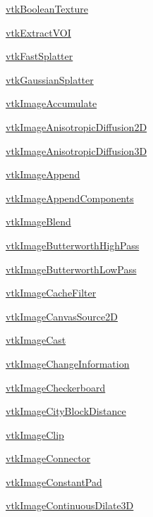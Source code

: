 
\begin{DoxyItemize}
\item \hyperlink{vtkimaging_vtkbooleantexture}{vtk\-Boolean\-Texture}  
\item \hyperlink{vtkimaging_vtkextractvoi}{vtk\-Extract\-V\-O\-I}  
\item \hyperlink{vtkimaging_vtkfastsplatter}{vtk\-Fast\-Splatter}  
\item \hyperlink{vtkimaging_vtkgaussiansplatter}{vtk\-Gaussian\-Splatter}  
\item \hyperlink{vtkimaging_vtkimageaccumulate}{vtk\-Image\-Accumulate}  
\item \hyperlink{vtkimaging_vtkimageanisotropicdiffusion2d}{vtk\-Image\-Anisotropic\-Diffusion2\-D}  
\item \hyperlink{vtkimaging_vtkimageanisotropicdiffusion3d}{vtk\-Image\-Anisotropic\-Diffusion3\-D}  
\item \hyperlink{vtkimaging_vtkimageappend}{vtk\-Image\-Append}  
\item \hyperlink{vtkimaging_vtkimageappendcomponents}{vtk\-Image\-Append\-Components}  
\item \hyperlink{vtkimaging_vtkimageblend}{vtk\-Image\-Blend}  
\item \hyperlink{vtkimaging_vtkimagebutterworthhighpass}{vtk\-Image\-Butterworth\-High\-Pass}  
\item \hyperlink{vtkimaging_vtkimagebutterworthlowpass}{vtk\-Image\-Butterworth\-Low\-Pass}  
\item \hyperlink{vtkimaging_vtkimagecachefilter}{vtk\-Image\-Cache\-Filter}  
\item \hyperlink{vtkimaging_vtkimagecanvassource2d}{vtk\-Image\-Canvas\-Source2\-D}  
\item \hyperlink{vtkimaging_vtkimagecast}{vtk\-Image\-Cast}  
\item \hyperlink{vtkimaging_vtkimagechangeinformation}{vtk\-Image\-Change\-Information}  
\item \hyperlink{vtkimaging_vtkimagecheckerboard}{vtk\-Image\-Checkerboard}  
\item \hyperlink{vtkimaging_vtkimagecityblockdistance}{vtk\-Image\-City\-Block\-Distance}  
\item \hyperlink{vtkimaging_vtkimageclip}{vtk\-Image\-Clip}  
\item \hyperlink{vtkimaging_vtkimageconnector}{vtk\-Image\-Connector}  
\item \hyperlink{vtkimaging_vtkimageconstantpad}{vtk\-Image\-Constant\-Pad}  
\item \hyperlink{vtkimaging_vtkimagecontinuousdilate3d}{vtk\-Image\-Continuous\-Dilate3\-D}  

\end{DoxyItemize}
